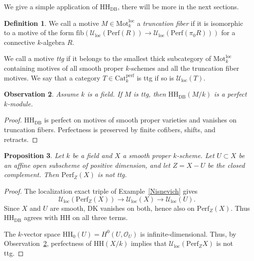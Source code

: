 \documentclass{amsart}
\theoremstyle{plain}
\newtheorem{prop}{Proposition}[section]
\newtheorem{obs}[prop]{Observation}
\theoremstyle{definition}
\newtheorem{defi}[prop]{Definition}
\newcommand{\ra}{\rightarrow}
\newcommand{\Catperf}{\mathrm{Cat}^{\mathrm{perf}}}
\newcommand{\Perf}{\mathrm{Perf}}
\newcommand{\Motloc}{\mathrm{Mot}^{\mathrm{loc}}}
\newcommand{\Uloc}{\mathcal U_{\mathrm{loc}}}
\newcommand{\HH}{\mathrm{HH}}
\newcommand{\fib}{\mathrm{fib}}
\newcommand{\DK}{\mathrm{DK}}
\newcommand{\DB}{\mathrm{DB}}
\begin{document}
\medskip

We give a simple application of $\HH_{\DB}$, there will be more in the next sections.

\begin{defi}\label{defittg}
    We call a motive $M\in \Motloc_k$ a \emph{truncation fiber} if it is isomorphic to a motive of the form $\fib(\Uloc(\Perf(R))\ra\Uloc(\Perf(\pi_0R)))$ for a connective $k$-algebra $R$.
    
    We call a motive \emph{ttg} if it belongs to the smallest thick subcategory of $\Motloc_k$ containing motives of all smooth proper $k$-schemes and all the truncation fiber motives. We say that a category $T\in\Catperf_k$ is ttg if so is $\Uloc(T)$.
\end{defi}

\begin{obs}\label{tgfiniteness}
Assume $k$ is a field. If $M$ is ttg, then $\HH_{\DB}(M/k)$ is a perfect
$k$-module.
\end{obs}

\begin{proof}
$\HH_{\DB}$ is perfect on motives of smooth proper varieties and vanishes on truncation fibers. Perfectness is preserved by finite cofibers, shifts, and retracts.
\end{proof}



\begin{prop}\label{PerfZXnotttg}
Let $k$ be a field and $X$ a smooth proper $k$-scheme. Let $U\subset X$ be an affine open subscheme of positive dimension, and let
$Z=X - U$ be the closed complement. Then $\Perf_Z(X)$ is not ttg.
\end{prop}

\begin{proof}
The localization exact triple of Example~\ref{Nisnevich} gives
\[
\Uloc(\Perf_Z(X))\longrightarrow\Uloc(X)\longrightarrow\Uloc(U).
\]
Since $X$ and $U$ are smooth, $\DK$ vanishes on both, hence also on $\Perf_Z(X)$. Thus $\HH_{\DB}$ agrees with $\HH$ on all three terms.

The $k$-vector space $\HH_0(U)=H^0(U,\mathcal{O}_U)$ is infinite-dimensional. Thus, by Observation~\ref{tgfiniteness}, perfectness of $\HH(X/k)$ implies that $\Uloc(\Perf_ZX)$ is not ttg.

\end{proof}






\medskip
\end{document}
